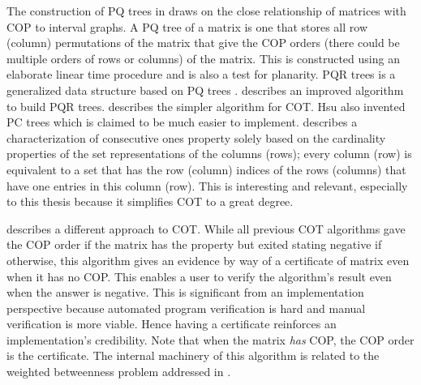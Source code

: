 \documentclass[MS,synopsis]{iitmdiss}
\begin{document}
The construction of PQ trees in \cite{bl76} draws on the
close relationship of matrices with COP to interval graphs. A PQ tree of a
matrix is one that stores all row (column) permutations of the matrix
that give the COP orders (there could be multiple orders of rows or columns) of the matrix. This
is constructed using an elaborate linear time procedure and is also
a test for planarity. %
PQR trees is a generalized data structure based on PQ trees
\cite{mm96,mpt98}.  \cite{tm05} describes an improved algorithm to
build PQR trees. \cite{wlh02}
describes the simpler algorithm for COT. Hsu also invented PC trees
\cite{wlh01}
which is claimed to be much easier to implement. \cite{nsnrs09}
describes a characterization of consecutive ones property solely based
on the cardinality properties of the set representations of the
columns (rows); every column (row) is equivalent to a set that has the
row (column) indices of the rows (columns) that have one entries in
this column (row). This is interesting and relevant, especially to
this thesis because it simplifies COT to a great
degree. 

\cite{mcc04} describes a different approach to COT. While all previous
COT algorithms gave the COP order if the matrix has the property but
exited stating negative if otherwise, this algorithm gives an evidence
by way of a certificate of matrix even when it has no COP. This
enables a user to verify the algorithm's result even when the answer
is negative. This is significant from an implementation perspective
because automated program verification is hard and manual verification
is more viable. Hence having a certificate reinforces an
implementation's credibility. Note that when the matrix {\em has} COP,
the COP order is the certificate.  The internal machinery of this
algorithm is related to the weighted betweenness problem
addressed in \cite{co98}.  
\end{document}
